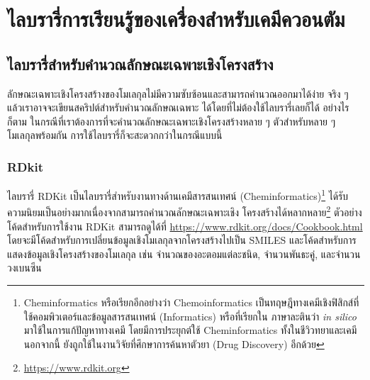 

\chapter{ไลบรารี่การเรียนรู้ของเครื่องสำหรับเคมีควอนตัม}
\label{ch:ml_lib}

\section{ไลบรารี่สำหรับคำนวณลักษณะเฉพาะเชิงโครงสร้าง}
\label{sec:lib_feat}

ลักษณะเฉพาะเชิงโครงสร้างของโมเลกุลไม่มีความซับซ้อนและสามารถคำนวณออกมาได้ง่าย จริง ๆ แล้วเราอาจจะเขียนสคริปต์สำหรับคำนวณลักษณเฉพาะ%
ได้โดยที่ไม่ต้องใช้ไลบรารี่เลยก็ได้ อย่างไรก็ตาม ในกรณีที่เราต้องการที่จะคำนวณลักษณะเฉพาะเชิงโครงสร้างหลาย ๆ ตัวสำหรับหลาย ๆ โมเลกุลพร้อมกัน 
การใช้ไลบรารี่ก็จะสะดวกกว่าในกรณีแบบนี้

\subsection{RDkit}
\label{ssec:rdkit}

ไลบรารี่ RDKit\autocite{rdkit} เป็นไลบรารี่สำหรับงานทางด้านเคมีสารสนเทศน์ (Cheminformatics)\footnote{Cheminformatics
หรือเรียกอีกอย่างว่า Chemoinformatics เป็นทฤษฎีทางเคมีเชิงฟิสิกส์ที่ใช้คอมพิวเตอร์และข้อมูลสารสนเทศน์ (Informatics) หรือที่เรียกใน%
ภาษาละตินว่า \textit{in silico} มาใช้ในการแก้ปัญหาทางเคมี โดยมีการประยุกต์ใช้ Cheminformatics ทั้งในชีวิวทยาและเคมี นอกจากนี้%
ยังถูกใช้ในงานวิจัยที่ศึกษาการค้นหาตัวยา (Drug Discovery) อีกด้วย} ได้รับความนิยมเป็นอย่างมากเนื่องจากสามารถคำนวณลักษณะเฉพาะเชิง%
โครงสร้างได้หลากหลาย\footnote{\url{https://www.rdkit.org}} ตัวอย่างโค้ดสำหรับการใช้งาน RDKit สามารถดูได้ที่ 
\url{https://www.rdkit.org/docs/Cookbook.html} โดยจะมีโค้ดสำหรับการเปลี่ยนข้อมูลเชิงโมเลกุลจากโครงสร้างไปเป็น SMILES 
และโค้ดสำหรับการแสดงข้อมูลเชิงโครงสร้างของโมเลกุล เช่น จำนวณของอะตอมแต่ละชนิด, จำนวนพันธะคู่, และจำนวนวงเบนซีน 

